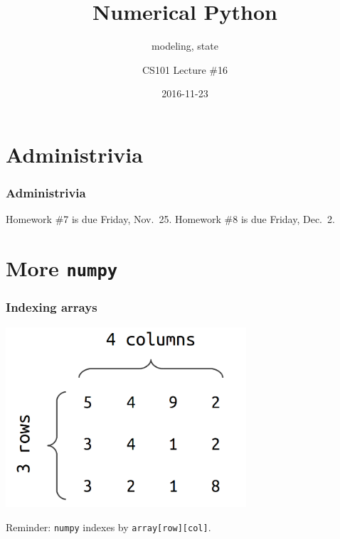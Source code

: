 \documentclass[11pt]{beamer}
\title{Numerical Python}
\subtitle{modeling, state}
\author{CS101 Lecture \#16}
\date{2016-11-23}
\begin{document}
  \setcounter{showProgressBar}{0}
  \setcounter{showSlideNumbers}{0}

\frame{\titlepage}

\setcounter{framenumber}{0}
\setcounter{showProgressBar}{1}
\setcounter{showSlideNumbers}{1}

\section{Administrivia}

\begin{frame}
  \frametitle{Administrivia}
  \Enlarge

  \begin{itemize}
  \myitem  Homework \#7 is due Friday, Nov.\ 25.
  \myitem  Homework \#8 is due Friday, Dec.\ 2.
  \end{itemize}
\end{frame}


\section{More \texttt{numpy}}

\begin{frame}[fragile]
  \frametitle{Indexing arrays}
  \Enlarge

  \includegraphics[width=0.67\textwidth]{./img/ndarray.png}

  \begin{enumerate}
  \myitem  Reminder:  \texttt{numpy} indexes by \texttt{array[row][col]}.
  \end{enumerate}
\end{frame}
\end{document}
